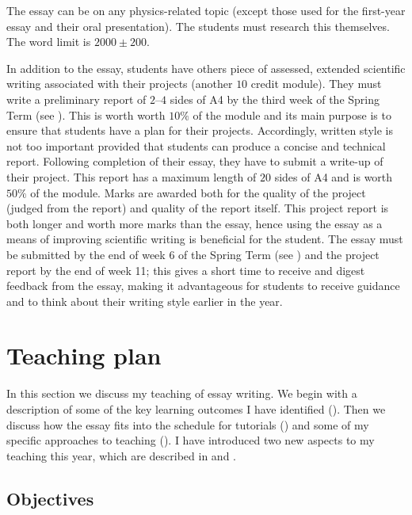 The essay can be on any physics-related topic (except those used for the first-year essay and their oral presentation). The students must research this themselves. The word limit is $2000 \pm 200$. 

In addition to the essay, students have others piece of assessed, extended scientific writing associated with their projects (another $10$ credit module). They must write a preliminary report of $2$--$4$ sides of A4 by the third week of the Spring Term (see ). This is worth worth $10\%$ of the module and its main purpose is to ensure that students have a plan for their projects. Accordingly, written style is not too important provided that students can produce a concise and technical report. Following completion of their essay, they have to submit a write-up of their project. This report has a maximum length of $20$ sides of A4 and is worth $50\%$ of the module. Marks are awarded both for the quality of the project (judged from the report) and quality of the report itself. This project report is both longer and worth more marks than the essay, hence using the essay as a means of improving scientific writing is beneficial for the student. The essay must be submitted by the end of week 6 of the Spring Term (see ) and the project report by the end of week 11; this gives a short time to receive and digest feedback from the essay, making it advantageous for students to receive guidance and to think about their writing style earlier in the year.


\section{Teaching plan}\label{sec:essay-teach}

In this section we discuss my teaching of essay writing. We begin with a description of some of the key learning outcomes I have identified (). Then we discuss how the essay fits into the schedule for tutorials () and some of my specific approaches to teaching (). I have introduced two new aspects to my teaching this year, which are described in  and .

\subsection{Objectives}\label{sec:essay-aims}

